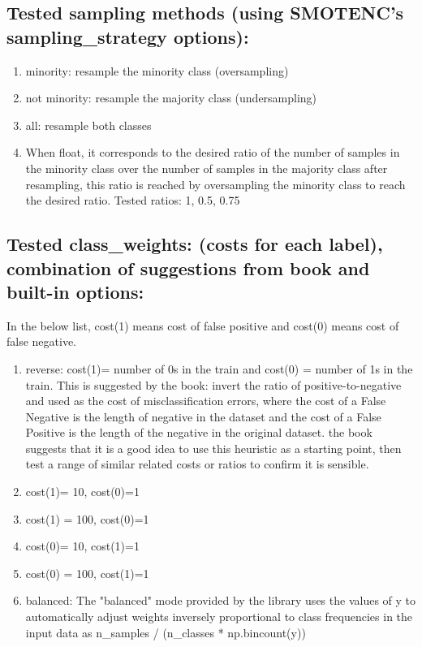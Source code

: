 \documentclass{article}
\begin{document}
\subsection{Tested sampling methods (using SMOTENC's sampling\_strategy options):}
\begin{enumerate}
    \item minority: resample the minority class (oversampling)
    \item not minority: resample the majority class (undersampling)
    \item all: resample both classes
    \item When float, it corresponds to the desired ratio of the number of samples in the minority class over the number of samples in the majority class after resampling, this ratio is reached by oversampling the minority class to reach the desired ratio. Tested ratios: 1, 0.5, 0.75
\end{enumerate}
\subsection{Tested class\_weights: (costs for each label), combination of suggestions from book and built-in options:}
In the below list, cost(1) means cost of false positive and cost(0) means cost of false negative.
\begin{enumerate}
    \item reverse: cost(1)= number of 0s in the train and cost(0) = number of 1s in the train. This is suggested by the book: invert the ratio of positive-to-negative and used as the cost of misclassification errors, where the cost of a False Negative is the length of negative in the dataset and the cost of a False Positive is the length of the negative in the original dataset. the book suggests that it is a good idea to use this heuristic as a starting point, then test a range of similar related costs or ratios to confirm it is sensible. 
    \item cost(1)= 10, cost(0)=1
    \item cost(1) = 100, cost(0)=1    
    \item cost(0)= 10, cost(1)=1
    \item cost(0) = 100, cost(1)=1
    \item balanced: The "balanced" mode provided by the library uses the values of y to automatically adjust weights inversely proportional to class frequencies in the input data as n\_samples / (n\_classes * np.bincount(y))
\end{enumerate}
\end{document}
